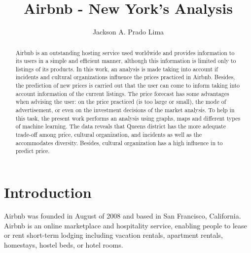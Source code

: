 \documentclass[sigconf]{acmart}
\begin{document}
	
\title{Airbnb - New York’s Analysis}

\author{Jackson A. Prado Lima}
	
\renewcommand{\shortauthors}{J. A. Prado Lima}
\renewcommand{\shorttitle}{Airbnb - New York’s Analysis}

\begin{abstract}
	Airbnb is an outstanding hosting service used worldwide and provides information to its users in a simple and efficient manner, although this information is limited only to listings of its products. In this work, an analysis is made taking into account if incidents and cultural organizations influence the prices practiced in Airbnb. Besides, the prediction of new prices is carried out that the user can come to inform taking into account information of the current listings. The price forecast has some advantages when advising the user: on the price practiced (is too large or small), the mode of advertisement, or even on the investment decisions of the market analysis. To help in this task, the present work performs an analysis using graphs, maps and different types of machine learning. The data reveals that Queens district has the more adequate trade-off among price, cultural organization, and incidents as well as the accommodates diversity. Besides, cultural organization has a high influence in to predict price.
\end{abstract}


\maketitle

\section{Introduction}

Airbnb was founded in August of 2008 and based in San Francisco, California. Airbnb is an online marketplace and hospitality service, enabling people to lease or rent short-term lodging including vacation rentals, apartment rentals, homestays, hostel beds, or hotel rooms. 
\end{document}
